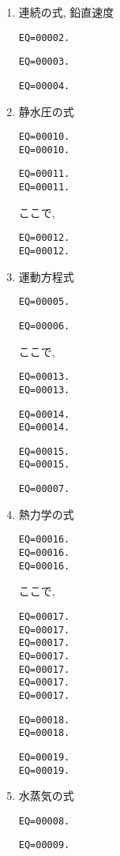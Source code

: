 \begin{enumerate}
\item 連続の式, 鉛直速度

\begin{verbatim}
EQ=00002.
\end{verbatim}
%
\begin{verbatim}
EQ=00003.
\end{verbatim}
%
\begin{verbatim}
EQ=00004.
\end{verbatim}
   
\item 静水圧の式

\begin{verbatim}
EQ=00010.
EQ=00010.
\end{verbatim}
%
\begin{verbatim}
EQ=00011.
EQ=00011.
\end{verbatim}
%
ここで,
%
\begin{verbatim}
EQ=00012.
EQ=00012.
\end{verbatim}

\item 運動方程式

\begin{verbatim}
EQ=00005.
\end{verbatim}
%
\begin{verbatim}
EQ=00006.
\end{verbatim}
%
ここで,
%
\begin{verbatim}
EQ=00013.
EQ=00013.
\end{verbatim}
%
\begin{verbatim}
EQ=00014.
EQ=00014.
\end{verbatim}
%
\begin{verbatim}
EQ=00015.
EQ=00015.
\end{verbatim}

\begin{verbatim}
EQ=00007.
\end{verbatim}

\item 熱力学の式

\begin{verbatim}
EQ=00016.
EQ=00016.
EQ=00016.
\end{verbatim}
%
ここで,
\begin{verbatim}
EQ=00017.
EQ=00017.
EQ=00017.
EQ=00017.
EQ=00017.
EQ=00017.
EQ=00017.
\end{verbatim}
%
\begin{verbatim}
EQ=00018.
EQ=00018.
\end{verbatim}
%
\begin{verbatim}
EQ=00019.
EQ=00019.
\end{verbatim}

\item 水蒸気の式

\begin{verbatim}
EQ=00008.
\end{verbatim}
%
\begin{verbatim}
EQ=00009.
\end{verbatim}

\end{enumerate}

